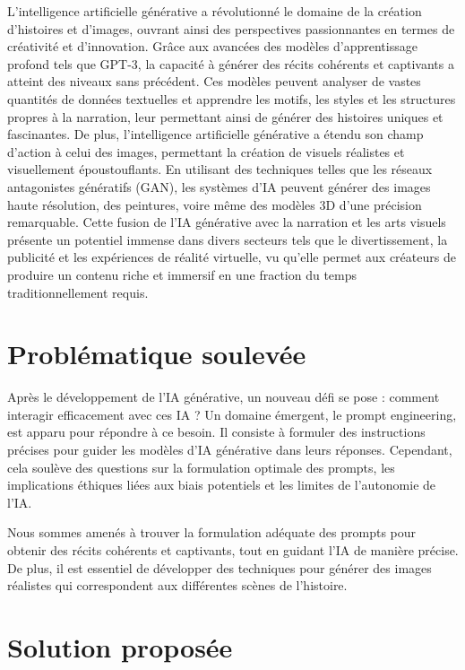 \documentclass[11,5pt]{report}
\begin{document}
\begin{spacing}{2}
\par 
L'intelligence artificielle générative a révolutionné le domaine de la création d'histoires et d'images, ouvrant ainsi des perspectives passionnantes en termes de créativité et d'innovation. Grâce aux avancées des modèles d'apprentissage profond tels que GPT-3, la capacité à générer des récits cohérents et captivants a atteint des niveaux sans précédent. Ces modèles peuvent analyser de vastes quantités de données textuelles et apprendre les motifs, les styles et les structures propres à la narration, leur permettant ainsi de générer des histoires uniques et fascinantes. De plus, l'intelligence artificielle générative a étendu son champ d'action à celui des images, permettant la création de visuels réalistes et visuellement époustouflants. En utilisant des techniques telles que les réseaux antagonistes génératifs (GAN), les systèmes d'IA peuvent générer des images haute résolution, des peintures, voire même des modèles 3D d'une précision remarquable. Cette fusion de l'IA générative avec la narration et les arts visuels présente un potentiel immense dans divers secteurs tels que le divertissement, la publicité et les expériences de réalité virtuelle, vu qu'elle permet aux créateurs de produire un contenu riche et immersif en une fraction du temps traditionnellement requis.


\section{Problématique soulevée}
\par 
Après le développement de l'IA générative, un nouveau défi se pose : comment interagir efficacement avec ces IA ? Un domaine émergent, le prompt engineering\cite{PromptGuide}, est apparu pour répondre à ce besoin. Il consiste à formuler des instructions précises pour guider les modèles d'IA générative dans leurs réponses. Cependant, cela soulève des questions sur la formulation optimale des prompts, les implications éthiques liées aux biais potentiels et les limites de l'autonomie de l'IA.  

Nous sommes amenés à trouver la formulation  adéquate des prompts pour obtenir des récits cohérents et captivants, tout en guidant l'IA de manière précise.   De plus, il est essentiel de développer des techniques pour générer des images réalistes qui correspondent aux différentes scènes de l'histoire. 



\section{Solution proposée}


\end{spacing}
\end{document}
